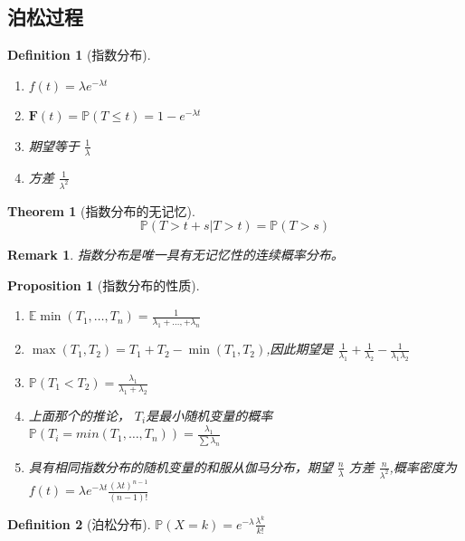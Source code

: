 \documentclass{article}
\newtheorem{theorem}{Theorem}
\newtheorem{definition}{Definition}
\newtheorem{proposition}{Proposition}
\newtheorem{remark}{Remark}
\begin{document}
\subsection{泊松过程}
\begin{definition}[指数分布]
  
    
    \begin{enumerate}
        \item $ f(t)=\lambda e^{-\lambda t} $
        \item $  \mathbf{F}(t)=\mathbb{P}(T \leqslant t)=1-e^{-\lambda t}$
        \item 期望等于 $ \frac{1}{\lambda} $
        \item 方差 $ \frac{1}{\lambda^2} $
    \end{enumerate}
\end{definition}
\begin{theorem}[指数分布的无记忆]
    \begin{equation}
        \mathbb{P}(T>t+s|T>t)=\mathbb{P}(T>s)
    \end{equation}
\end{theorem}


\begin{remark}
    指数分布是唯一具有无记忆性的连续概率分布。
\end{remark}


\begin{proposition}[指数分布的性质]
    \begin{enumerate}
        \item $ \mathbb{E}\min(T_1,\dots,T_n)=\frac{1}{\lambda_1+\dots,+\lambda_n} $
        \item $ \max(T_1,T_2)=T_1+T_2-\min(T_1,T_2) $,因此期望是 $ \frac{1}{\lambda_1}+\frac{1}{\lambda_2}-\frac{1}{\lambda_1 \lambda_2} $
        \item $ \mathbb{P}(T_1<T_2)=\frac{\lambda_1}{\lambda_1+\lambda_2} $
        \item 上面那个的推论， $ T_i  $是最小随机变量的概率 $ \mathbb{P}(T_i=min(T_1,\dots,T_n))=\frac{\lambda_1}{\sum \lambda_n}$
        \item 具有相同指数分布的随机变量的和服从伽马分布，期望 $ \frac{n}{\lambda} $ 方差 $ \frac{n}{\lambda^2} $,概率密度为 $ f(t)=\lambda e^{-\lambda t}\frac{(\lambda t)^{n-1}}{(n-1)!} $
    \end{enumerate}
\end{proposition}

\begin{definition}[泊松分布]
    $\mathbb{P}(X=k)=e^{-\lambda}\frac{\lambda^k}{k!}$
\end{definition}
\end{document}
